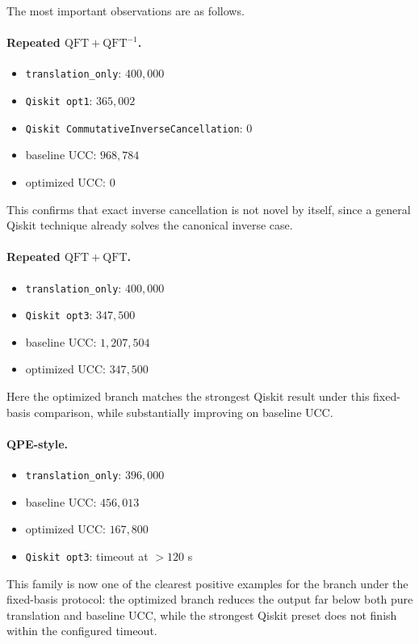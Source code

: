 \documentclass[11pt]{article}
\begin{document}
The most important observations are as follows.

\paragraph{Repeated $\mathrm{QFT}+\mathrm{QFT}^{-1}$.}
\begin{itemize}[leftmargin=1.5em]
    \item \texttt{translation\_only}: $400{,}000$
    \item \texttt{Qiskit opt1}: $365{,}002$
    \item \texttt{Qiskit CommutativeInverseCancellation}: $0$
    \item baseline UCC: $968{,}784$
    \item optimized UCC: $0$
\end{itemize}
This confirms that exact inverse cancellation is not novel by itself, since a general Qiskit technique already solves the canonical inverse case.

\paragraph{Repeated $\mathrm{QFT}+\mathrm{QFT}$.}
\begin{itemize}[leftmargin=1.5em]
    \item \texttt{translation\_only}: $400{,}000$
    \item \texttt{Qiskit opt3}: $347{,}500$
    \item baseline UCC: $1{,}207{,}504$
    \item optimized UCC: $347{,}500$
\end{itemize}
Here the optimized branch matches the strongest Qiskit result under this fixed-basis comparison, while substantially improving on baseline UCC.

\paragraph{QPE-style.}
\begin{itemize}[leftmargin=1.5em]
    \item \texttt{translation\_only}: $396{,}000$
    \item baseline UCC: $456{,}013$
    \item optimized UCC: $167{,}800$
    \item \texttt{Qiskit opt3}: timeout at $>120$ s
\end{itemize}
This family is now one of the clearest positive examples for the branch under the fixed-basis protocol: the optimized branch reduces the output far below both pure translation and baseline UCC, while the strongest Qiskit preset does not finish within the configured timeout.
\end{document}
